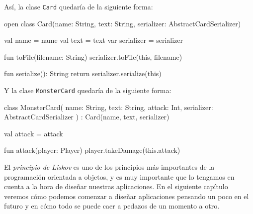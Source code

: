   Así, la clase \texttt{Card} quedaría de la siguiente forma:

  \begin{kotlin}
    open class Card(name: String, text: String, serializer: AbstractCardSerializer) {
      val name = name
      val text = text
      var serializer = serializer

      fun toFile(filename: String) {
        serializer.toFile(this, filename)
      }

      fun serialize(): String {
        return serializer.serialize(this)
      }
    }
  \end{kotlin}

  Y la clase \texttt{MonsterCard} quedaría de la siguiente forma:

  \begin{kotlin}
    class MonsterCard(
      name: String,
      text: String,
      attack: Int,
      serializer: AbstractCardSerializer
    ) : Card(name, text, serializer) {
      val attack = attack
      
      fun attack(player: Player) {
        player.takeDamage(this.attack)
      }
    }
  \end{kotlin}

  El \textit{principio de Liskov} es uno de los principios más importantes de la programación 
  orientada a objetos, y es muy importante que lo tengamos en cuenta a la hora de diseñar nuestras
  aplicaciones.
  En el siguiente capítulo veremos cómo podemos comenzar a diseñar aplicaciones pensando un poco en
  el futuro y en cómo todo se puede caer a pedazos de un momento a otro.